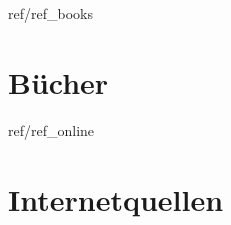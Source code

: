 	

\begin{btSect}{ref/ref_books}
 \section{Bücher}
 \btPrintAll
\end{btSect}


\begin{btSect}{ref/ref_online}
 \section{Internetquellen}
 \btPrintAll
\end{btSect}